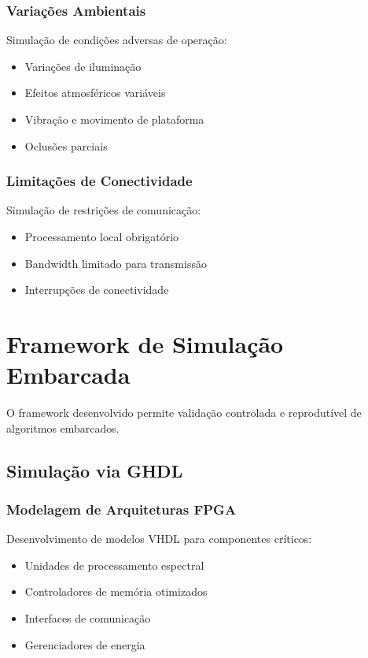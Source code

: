 \subsubsection{Variações Ambientais}
Simulação de condições adversas de operação:
\begin{itemize}
    \item Variações de iluminação
    \item Efeitos atmosféricos variáveis
    \item Vibração e movimento de plataforma
    \item Oclusões parciais
\end{itemize}

\subsubsection{Limitações de Conectividade}
Simulação de restrições de comunicação:
\begin{itemize}
    \item Processamento local obrigatório
    \item Bandwidth limitado para transmissão
    \item Interrupções de conectividade
\end{itemize}

\section{Framework de Simulação Embarcada}\label{sec:framework_simulacao}

O framework desenvolvido permite validação controlada e reprodutível de algoritmos embarcados.

\subsection{Simulação via GHDL}

\subsubsection{Modelagem de Arquiteturas FPGA}
Desenvolvimento de modelos VHDL para componentes críticos:
\begin{itemize}
    \item Unidades de processamento espectral
    \item Controladores de memória otimizados
    \item Interfaces de comunicação
    \item Gerenciadores de energia
\end{itemize}

